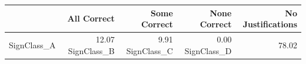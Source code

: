\begin{tabular}{lrrrr}
\toprule
 & All Correct & Some Correct & None Correct & No Justifications \\
\midrule
SignClass_A & 12.07%
SignClass_B & 9.91%
SignClass_C & 0.00%
SignClass_D & 78.02%
\bottomrule
\end{tabular}
